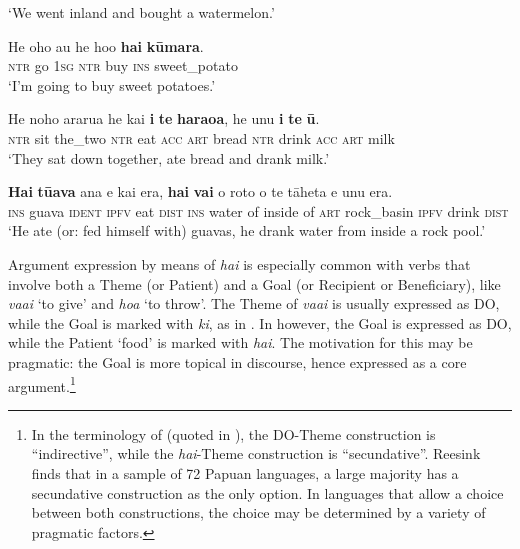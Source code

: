 \glt 
‘We went inland and bought a watermelon.’ \textstyleExampleref{[R121.070]} 
\z

\ea\label{ex:8.131}
\gll He oho au he ho{\ꞌ}o \textbf{hai} \textbf{kūmara}.\\
\textsc{ntr} go \textsc{1sg} \textsc{ntr} buy \textsc{ins} sweet\_potato\\

\glt 
‘I’m going to buy sweet potatoes.’ \textstyleExampleref{[Notes]}
\z

\ea\label{ex:8.132}
\gll He noho ararua he kai \textbf{i} \textbf{te} \textbf{haraoa}, he unu \textbf{i} \textbf{te} \textbf{ū}. \\
\textsc{ntr} sit the\_two \textsc{ntr} eat \textsc{acc} \textsc{art} bread \textsc{ntr} drink \textsc{acc} \textsc{art} milk \\

\glt 
‘They sat down together, ate bread and drank milk.’ \textstyleExampleref{[R334.119]} 
\z

\ea\label{ex:8.133}
\gll \textbf{Hai} \textbf{tūava} {\ꞌ}ana e kai era, \textbf{hai} \textbf{vai} o roto o te tāheta e unu era.\\
\textsc{ins} guava \textsc{ident} \textsc{ipfv} eat \textsc{dist} \textsc{ins} water of inside of \textsc{art} rock\_basin \textsc{ipfv} drink \textsc{dist}\\

\glt 
‘He ate (or: fed himself with) guavas, he drank water from inside a rock pool.’ \textstyleExampleref{[R439.014]} 
\z

Argument expression by means of \textit{hai} is especially common with verbs that involve both a Theme (or Patient) and a Goal (or Recipient or Beneficiary), like \textit{va{\ꞌ}ai} ‘to give’ and \textit{hoa} ‘to throw’. The Theme of \textit{va{\ꞌ}ai} is usually expressed as DO, while the Goal is marked with \textit{ki}, as in . In  however, the Goal is expressed as DO, while the Patient ‘food’ is marked with \textit{hai}. The motivation for this may be pragmatic: the Goal is more topical in discourse, hence expressed as a core argument.\footnote{\label{fn:440}In the terminology of \citealt{Haspelmath2005} (quoted in \citealt{Reesink2013}), the DO-Theme construction is “indirective”, while the \textit{hai}{}-Theme construction is “secundative”. Reesink finds that in a sample of 72 Papuan languages, a large majority has a secundative construction as the only option. In languages that allow a choice between both constructions, the choice may be determined by a variety of pragmatic factors.}

